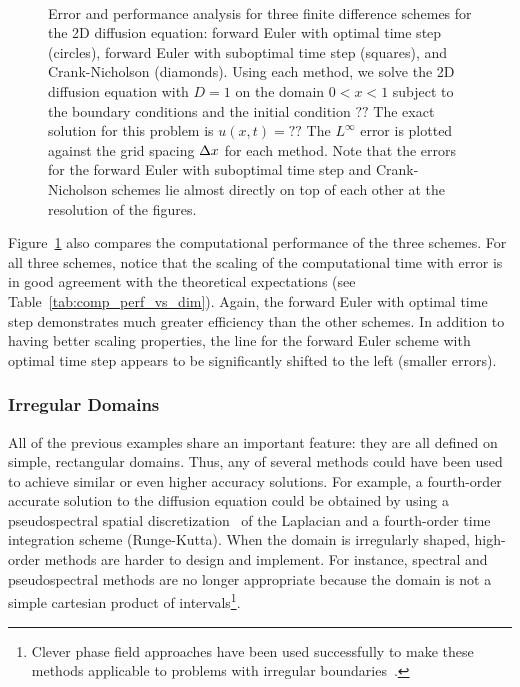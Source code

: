 \documentclass[oneeqnum,onefignum,onetabnum,onethmnum]{siamltex}
\begin{document}
\begin{figure}[htb]
\begin{center}
\ \ 
\caption{Error and performance analysis for three finite difference schemes 
for the 2D diffusion equation: forward Euler with optimal time step (circles), 
forward Euler with suboptimal time step (squares), and Crank-Nicholson 
(diamonds).  Using each method, we solve the 2D diffusion equation with 
$D = 1$ on the domain $0 < x < 1$ subject to the boundary conditions 
and the initial condition
$??$
The exact solution for this problem is
$u(x,t) = ??$
The $L^\infty$ error is plotted against the grid spacing $\Delta x$ for each 
method.  Note that the errors for the forward Euler with suboptimal time 
step and Crank-Nicholson schemes lie almost directly on top of each other
at the resolution of the figures.
}
\label{fig:diffusion_eqn_2d_src_analysis}
\end{center}
\end{figure}

Figure~\ref{fig:diffusion_eqn_2d_src_analysis} also compares the computational
performance of the three schemes.  For all three schemes, notice that the 
scaling of the computational time with error is in good agreement with the 
theoretical expectations (see Table~\ref{tab:comp_perf_vs_dim}).  Again, the 
forward Euler with optimal time step demonstrates much greater efficiency 
than the other schemes.  In addition to having better scaling properties, 
the line for the forward Euler scheme with optimal time step appears to be 
significantly shifted to the left (\ie smaller errors).


\subsubsection{Irregular Domains}
All of the previous examples share an important feature: they are all
defined on simple, rectangular domains.  Thus, any of several methods 
could have been used to achieve similar or even higher accuracy solutions.
For example, a fourth-order accurate solution to the diffusion equation
could be obtained by using a pseudospectral spatial
discretization~\cite{trefethen_spectral_book, boyd_book} of the Laplacian
and a fourth-order time integration scheme (\eg Runge-Kutta).
When the domain is irregularly shaped, high-order methods are harder to design 
and implement.  For instance, spectral and pseudospectral methods are no 
longer appropriate because the domain is not a simple cartesian product of 
intervals\footnote{Clever phase field approaches have been used successfully 
to make these methods applicable to problems with irregular 
boundaries~\cite{liu??}.}.
\end{document}
